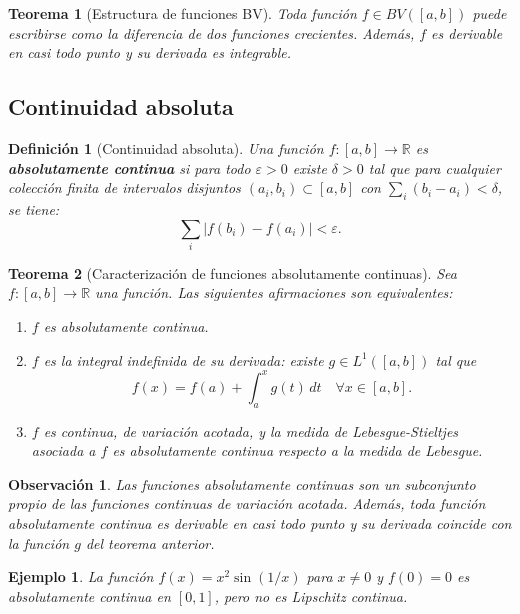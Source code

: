 \documentclass[12pt]{book}
\newtheorem{theorem}{Teorema}
\newtheorem{definition}{Definición}
\newtheorem{remark}{Observación}
\newtheorem{ex}{Ejemplo}
\theoremstyle{definition}
\theoremstyle{plain}
\theoremstyle{remark}
\begin{document}
\begin{theorem}[Estructura de funciones BV]
Toda función \(f \in BV([a,b])\) puede escribirse como la diferencia de dos funciones crecientes. Además, \(f\) es derivable en casi todo punto y su derivada es integrable.
\end{theorem}

\subsection{Continuidad absoluta}

\begin{definition}[Continuidad absoluta]
Una función \(f: [a,b] \to \mathbb{R}\) es \textbf{absolutamente continua} si para todo \(\varepsilon > 0\) existe \(\delta > 0\) tal que para cualquier colección finita de intervalos disjuntos \((a_i, b_i) \subset [a,b]\) con \(\sum_{i} (b_i - a_i) < \delta\), se tiene:
\[
\sum_{i} |f(b_i) - f(a_i)| < \varepsilon.
\]
\end{definition}

\begin{theorem}[Caracterización de funciones absolutamente continuas]
Sea \(f: [a,b] \to \mathbb{R}\) una función. Las siguientes afirmaciones son equivalentes:
\begin{enumerate}
    \item \(f\) es absolutamente continua.
    \item \(f\) es la integral indefinida de su derivada: existe \(g \in L^1([a,b])\) tal que
    \[
    f(x) = f(a) + \int_a^x g(t) \, dt \quad \forall x \in [a,b].
    \]
    \item \(f\) es continua, de variación acotada, y la medida de Lebesgue-Stieltjes asociada a \(f\) es absolutamente continua respecto a la medida de Lebesgue.
\end{enumerate}
\end{theorem}

\begin{remark}
Las funciones absolutamente continuas son un subconjunto propio de las funciones continuas de variación acotada. Además, toda función absolutamente continua es derivable en casi todo punto y su derivada coincide con la función \(g\) del teorema anterior.
\end{remark}

\begin{ex}
La función \(f(x) = x^2 \sin(1/x)\) para \(x \neq 0\) y \(f(0) = 0\) es absolutamente continua en \([0,1]\), pero no es Lipschitz continua.
\end{ex}
\end{document}
